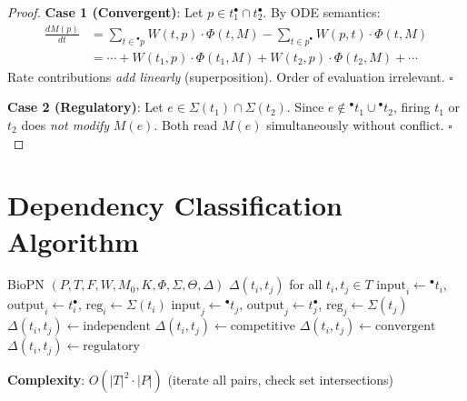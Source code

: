 \documentclass[runningheads]{llncs}
\newcommand{\preset}[1]{\ensuremath{{}^{\bullet}#1}}
\newcommand{\postset}[1]{\ensuremath{#1^{\bullet}}}
\newcommand{\RegSet}[1]{\ensuremath{\Sigma(#1)}}
\begin{document}
\begin{proof}
\textbf{Case 1 (Convergent)}: Let $p \in \postset{t_1} \cap \postset{t_2}$. By ODE semantics:
\begin{align}
\frac{dM(p)}{dt} &= \sum_{t \in \preset{p}} W(t,p) \cdot \Phi(t, M) - \sum_{t \in \postset{p}} W(p,t) \cdot \Phi(t, M) \\
&= \cdots + W(t_1,p) \cdot \Phi(t_1, M) + W(t_2,p) \cdot \Phi(t_2, M) + \cdots
\end{align}
Rate contributions \emph{add linearly} (superposition). Order of evaluation irrelevant. $\square$

\textbf{Case 2 (Regulatory)}: Let $e \in \RegSet{t_1} \cap \RegSet{t_2}$. Since $e \notin \preset{t_1} \cup \preset{t_2}$, firing $t_1$ or $t_2$ does \emph{not modify} $M(e)$. Both read $M(e)$ simultaneously without conflict. $\square$
\end{proof}

\section{Dependency Classification Algorithm}
\label{sec:classification}

\begin{algorithm}[t]
\caption{Classify Transition Dependencies}
\label{alg:classify}
\begin{algorithmic}[1]
\REQUIRE BioPN $(P, T, F, W, M_0, K, \Phi, \Sigma, \Theta, \Delta)$
\ENSURE $\Delta(t_i, t_j)$ for all $t_i, t_j \in T$
    \STATE $\text{input}_i \gets \preset{t_i}$, $\text{output}_i \gets \postset{t_i}$, $\text{reg}_i \gets \RegSet{t_i}$
    \STATE $\text{input}_j \gets \preset{t_j}$, $\text{output}_j \gets \postset{t_j}$, $\text{reg}_j \gets \RegSet{t_j}$
        \STATE $\Delta(t_i, t_j) \gets \text{independent}$
        \STATE $\Delta(t_i, t_j) \gets \text{competitive}$
        \STATE $\Delta(t_i, t_j) \gets \text{convergent}$
        \STATE $\Delta(t_i, t_j) \gets \text{regulatory}$
    \ENDIF
\ENDFOR
\end{algorithmic}
\end{algorithm}

\textbf{Complexity}: $O(|T|^2 \cdot |P|)$ (iterate all pairs, check set intersections)
\end{document}
